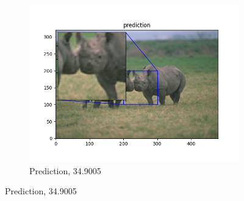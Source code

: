 \documentclass[12pt]{article}
\begin{document}
\begin{figure}[h!]
\begin{subfigure}[b]{0.32\linewidth}
    \includegraphics[width=\linewidth]{./2-prediction.png}
    \caption{Prediction, 34.9005}
  \end{subfigure}


\end{figure}
\end{document}

